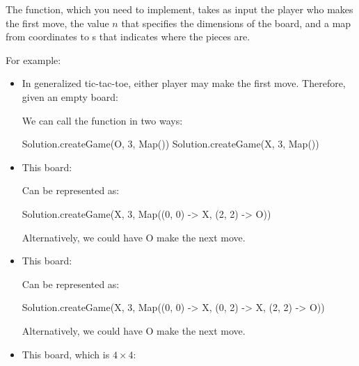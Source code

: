 \documentclass[9pt]{extbook}
\begin{document}
The  function, which you need to implement,
takes as input the player who makes the first move, the
value $n$ that specifies the dimensions of the board, and a map from coordinates to s
that indicates where the pieces are.

For example:

\begin{itemize}

  \item In generalized tic-tac-toe, either player may make the first move.
  Therefore, given an empty board:


  We can call the function in two ways:

  \begin{scalacode}
  Solution.createGame(O, 3, Map())
  Solution.createGame(X, 3, Map())
  \end{scalacode}

\item This board:


Can be represented as:
\begin{scalacode}
Solution.createGame(X, 3, Map((0, 0) -> X, (2, 2) -> O))
\end{scalacode}
Alternatively, we could have O make the next move.

\item This board:


Can be represented as:
\begin{scalacode}
Solution.createGame(X, 3, Map((0, 0) -> X, (0, 2) -> X, (2, 2) -> O))
\end{scalacode}
Alternatively, we could have O make the next move.

\item This board, which is $4 \times 4$:


\end{itemize}
\end{document}
